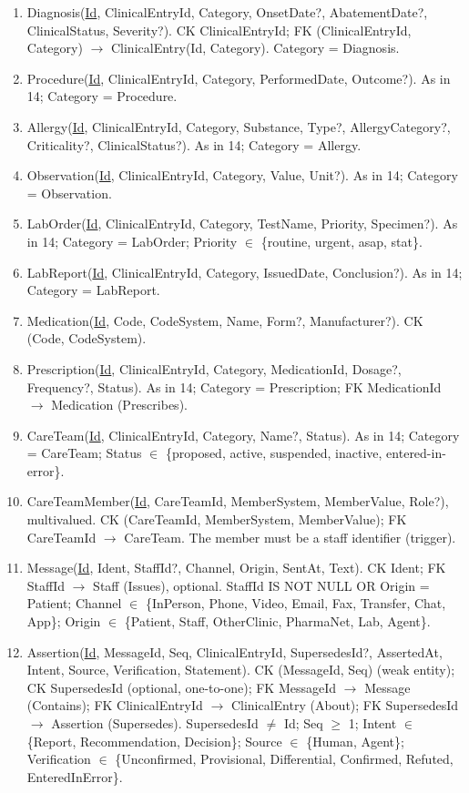 \documentclass[sigconf]{acmart}
\begin{document}
\begin{enumerate}
\item Diagnosis(\underline{Id}, ClinicalEntryId, Category, OnsetDate?, AbatementDate?, ClinicalStatus, Severity?). CK ClinicalEntryId; FK (ClinicalEntryId, Category) $\to$ ClinicalEntry(Id, Category). Category = Diagnosis.
\item Procedure(\underline{Id}, ClinicalEntryId, Category, PerformedDate, Outcome?). As in 14; Category = Procedure.
\item Allergy(\underline{Id}, ClinicalEntryId, Category, Substance, Type?, AllergyCategory?, Criticality?, ClinicalStatus?). As in 14; Category = Allergy.
\item Observation(\underline{Id}, ClinicalEntryId, Category, Value, Unit?). As in 14; Category = Observation.
\item LabOrder(\underline{Id}, ClinicalEntryId, Category, TestName, Priority, Specimen?). As in 14; Category = LabOrder; Priority $\in$ \{routine, urgent, asap, stat\}.
\item LabReport(\underline{Id}, ClinicalEntryId, Category, IssuedDate, Conclusion?). As in 14; Category = LabReport.
\item Medication(\underline{Id}, Code, CodeSystem, Name, Form?, Manufacturer?). CK (Code, CodeSystem).
\item Prescription(\underline{Id}, ClinicalEntryId, Category, MedicationId, Dosage?, Frequency?, Status). As in 14; Category = Prescription; FK MedicationId $\to$ Medication (Prescribes).
\item CareTeam(\underline{Id}, ClinicalEntryId, Category, Name?, Status). As in 14; Category = CareTeam; Status $\in$ \{proposed, active, suspended, inactive, entered-in-error\}.
\item CareTeamMember(\underline{Id}, CareTeamId, MemberSystem, MemberValue, Role?), multivalued. CK (CareTeamId, MemberSystem, MemberValue); FK CareTeamId $\to$ CareTeam. The member must be a staff identifier (trigger).
\item Message(\underline{Id}, Ident, StaffId?, Channel, Origin, SentAt, Text). CK Ident; FK StaffId $\to$ Staff (Issues), optional. StaffId IS NOT NULL OR Origin = Patient; Channel $\in$ \{InPerson, Phone, Video, Email, Fax, Transfer, Chat, App\}; Origin $\in$ \{Patient, Staff, OtherClinic, PharmaNet, Lab, Agent\}.
\item Assertion(\underline{Id}, MessageId, Seq, ClinicalEntryId, SupersedesId?, AssertedAt, Intent, Source, Verification, Statement). CK (MessageId, Seq) (weak entity); CK SupersedesId (optional, one-to-one); FK MessageId $\to$ Message (Contains); FK ClinicalEntryId $\to$ ClinicalEntry (About); FK SupersedesId $\to$ Assertion (Supersedes). SupersedesId $\ne$ Id; Seq $\ge$ 1; Intent $\in$ \{Report, Recommendation, Decision\}; Source $\in$ \{Human, Agent\}; Verification $\in$ \{Unconfirmed, Provisional, Differential, Confirmed, Refuted, EnteredInError\}.

\end{enumerate}
\end{document}
